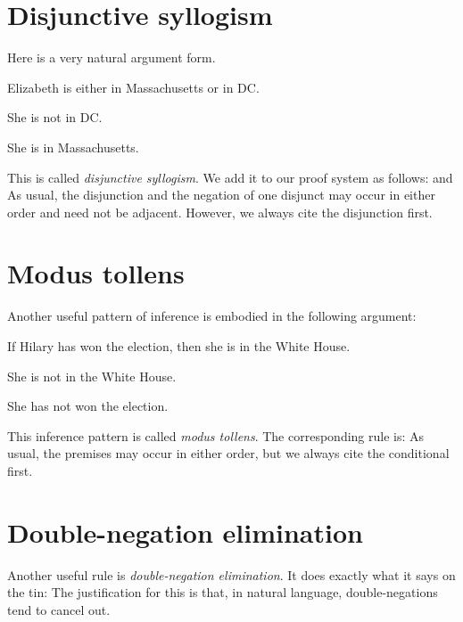 \section{Disjunctive syllogism}
Here is a very natural argument form.
	\begin{earg}
		\item Elizabeth is either in Massachusetts or in DC. 
		\item She is not in DC. 
		\item[\texttherefore] She is in Massachusetts.
	\end{earg}
This is called \emph{disjunctive syllogism}. We add it to our proof system as follows:
and
As usual, the disjunction and the negation of one disjunct may occur in either order and need not be adjacent. However, we always cite the disjunction first.

\section{Modus tollens}
Another useful pattern of inference is embodied in the following argument:
	\begin{earg}
		\item If Hilary has won the election, then she is in the White
		House. 
		\item She is not in the White House. 
		\item[\texttherefore] She has not won the election.
	\end{earg}
This inference pattern is called \emph{modus tollens}. The corresponding rule is:
As usual, the premises may occur in either order, but we always cite the conditional first.

\section{Double-negation elimination}
Another useful rule is \emph{double-negation elimination}. It does exactly what it says on the tin:
The justification for this is that, in natural language, double-negations tend to cancel out.

